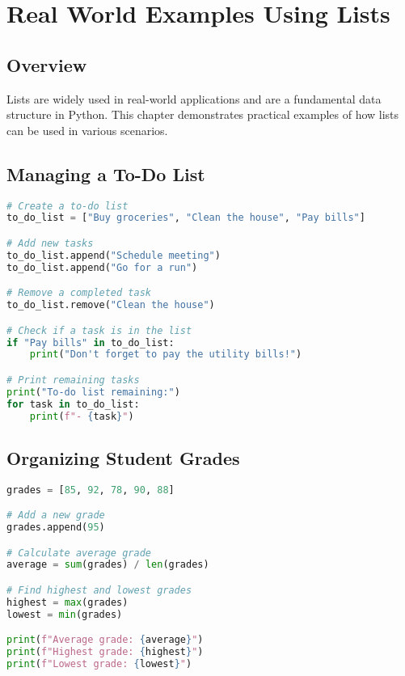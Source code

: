 \chapter{Real World Examples Using Lists}

\section{Overview}

Lists are widely used in real-world applications and are a fundamental data structure in Python.  
This chapter demonstrates practical examples of how lists can be used in various scenarios.

\section{Managing a To-Do List}

\begin{lstlisting}[language=Python]
# Create a to-do list
to_do_list = ["Buy groceries", "Clean the house", "Pay bills"]

# Add new tasks
to_do_list.append("Schedule meeting")
to_do_list.append("Go for a run")

# Remove a completed task
to_do_list.remove("Clean the house")

# Check if a task is in the list
if "Pay bills" in to_do_list:
    print("Don't forget to pay the utility bills!")

# Print remaining tasks
print("To-do list remaining:")
for task in to_do_list:
    print(f"- {task}")
\end{lstlisting}

\section{Organizing Student Grades}

\begin{lstlisting}[language=Python]
grades = [85, 92, 78, 90, 88]

# Add a new grade
grades.append(95)

# Calculate average grade
average = sum(grades) / len(grades)

# Find highest and lowest grades
highest = max(grades)
lowest = min(grades)

print(f"Average grade: {average}")
print(f"Highest grade: {highest}")
print(f"Lowest grade: {lowest}")
\end{lstlisting}

